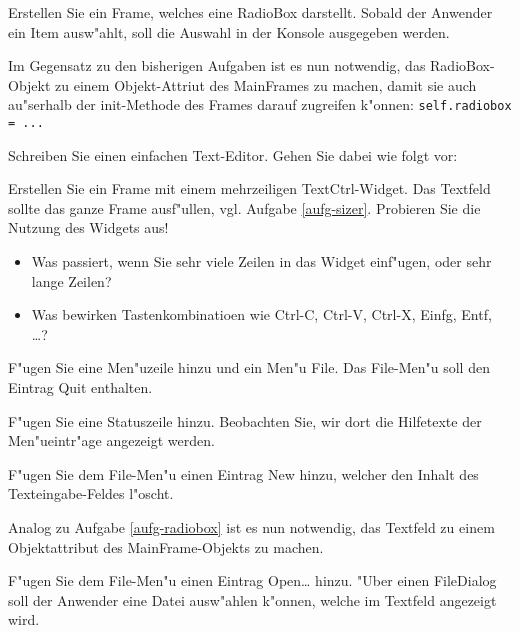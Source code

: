\begin{aufgabe}[RadioBox]
\label{aufg-radiobox}
Erstellen Sie ein Frame, welches eine RadioBox darstellt. Sobald der Anwender ein Item ausw"ahlt, soll die Auswahl in der Konsole ausgegeben werden.

\hinweis Im Gegensatz zu den bisherigen Aufgaben ist es nun notwendig, das RadioBox-Objekt zu einem Objekt-Attriut des MainFrames zu machen, damit sie auch au"serhalb der init-Methode des Frames darauf zugreifen k"onnen: \lstinline{self.radiobox = ...}
\end{aufgabe}

\begin{aufgabe}
Schreiben Sie einen einfachen Text-Editor. Gehen Sie dabei wie folgt vor:
\begin{teilaufgabe}
Erstellen Sie ein Frame mit einem mehrzeiligen TextCtrl-Widget. Das Textfeld sollte das ganze Frame ausf"ullen, vgl. Aufgabe \ref{aufg-sizer}. Probieren Sie die Nutzung des Widgets aus!
\begin{itemize}
\item Was passiert, wenn Sie sehr viele Zeilen in das Widget einf"ugen, oder sehr lange Zeilen?
\item Was bewirken Tastenkombinatioen wie Ctrl-C, Ctrl-V, Ctrl-X, Einfg, Entf, \dots?
\end{itemize}
\end{teilaufgabe}
\begin{teilaufgabe}[Men"us]
F"ugen Sie eine Men"uzeile hinzu und ein Men"u \glqq File\grqq. Das File-Men"u soll den Eintrag \glqq Quit\grqq{} enthalten.
\end{teilaufgabe}
\begin{teilaufgabe}[Statuszeile]
F"ugen Sie eine Statuszeile hinzu. Beobachten Sie, wir dort die Hilfetexte der Men"ueintr"age angezeigt werden.
\end{teilaufgabe}
\begin{teilaufgabe}
F"ugen Sie dem File-Men"u einen Eintrag \glqq New\grqq{} hinzu, welcher den Inhalt des Texteingabe-Feldes l"oscht.

\hinweis Analog zu Aufgabe \ref{aufg-radiobox} ist es nun notwendig, das Textfeld zu einem Objektattribut des MainFrame-Objekts zu machen.
\end{teilaufgabe}
\begin{teilaufgabe}
F"ugen Sie dem File-Men"u einen Eintrag \glqq Open\dots\grqq{} hinzu. "Uber einen FileDialog soll der Anwender eine Datei ausw"ahlen k"onnen, welche im Textfeld angezeigt wird.
\end{teilaufgabe}


\end{aufgabe}
